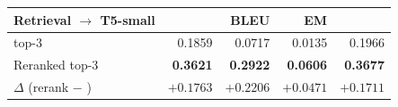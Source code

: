 \begin{tabular}{lrrrr}
    \toprule
    Retrieval $\to$ T5-small & \rougel{} & BLEU & EM & \Tokenf{} \\
    \midrule
    \bmtwofive{} top-3 & 0.1859 & 0.0717 & 0.0135 & 0.1966 \\
    Reranked top-3 & \textbf{0.3621} & \textbf{0.2922} & \textbf{0.0606} & \textbf{0.3677} \\
    $\Delta$ (rerank $-$ \bmtwofive{}) & $\mathbf{+0.1763}$ & $\mathbf{+0.2206}$ & $\mathbf{+0.0471}$ & $\mathbf{+0.1711}$ \\
    \bottomrule
\end{tabular}
